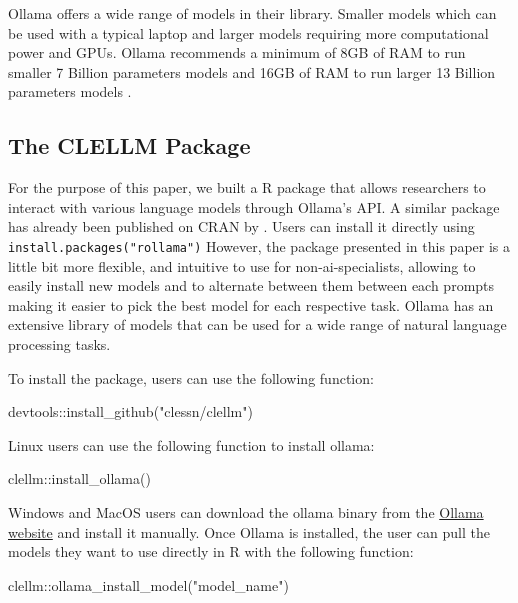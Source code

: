 \documentclass[
  authoryear,
  preprint,
  3p]{elsarticle}
\newenvironment{Shaded}{\begin{snugshade}}{\end{snugshade}}
\newcommand{\FunctionTok}[1]{\textcolor[rgb]{0.28,0.35,0.67}{#1}}
\newcommand{\NormalTok}[1]{\textcolor[rgb]{0.00,0.23,0.31}{#1}}
\newcommand{\SpecialCharTok}[1]{\textcolor[rgb]{0.37,0.37,0.37}{#1}}
\newcommand{\StringTok}[1]{\textcolor[rgb]{0.13,0.47,0.30}{#1}}
\begin{document}
Ollama offers a wide range of models in their library. Smaller models
which can be used with a typical laptop and larger models requiring more
computational power and GPUs. Ollama recommends a minimum of 8GB of RAM
to run smaller 7 Billion parameters models and 16GB of RAM to run larger
13 Billion parameters models \citep{ollama24}.

\subsection{The CLELLM Package}\label{the-clellm-package}

For the purpose of this paper, we built a R package that allows
researchers to interact with various language models through Ollama's
API. A similar package has already been published on CRAN by
\citet{gruber_weber24}. Users can install it directly using
\texttt{install.packages("rollama")} However, the package presented in
this paper is a little bit more flexible, and intuitive to use for
non-ai-specialists, allowing to easily install new models and to
alternate between them between each prompts making it easier to pick the
best model for each respective task. Ollama has an extensive library of
models that can be used for a wide range of natural language processing
tasks.

To install the package, users can use the following function:

\begin{Shaded}
\begin{Highlighting}[]
\NormalTok{devtools}\SpecialCharTok{::}\FunctionTok{install\_github}\NormalTok{(}\StringTok{"clessn/clellm"}\NormalTok{)}
\end{Highlighting}
\end{Shaded}

Linux users can use the following function to install ollama:

\begin{Shaded}
\begin{Highlighting}[]
\NormalTok{clellm}\SpecialCharTok{::}\FunctionTok{install\_ollama}\NormalTok{()}
\end{Highlighting}
\end{Shaded}

Windows and MacOS users can download the ollama binary from the
\href{https://ollama.com/}{Ollama website} and install it manually. Once
Ollama is installed, the user can pull the models they want to use
directly in R with the following function:

\begin{Shaded}
\begin{Highlighting}[]
\NormalTok{clellm}\SpecialCharTok{::}\FunctionTok{ollama\_install\_model}\NormalTok{(}\StringTok{"model\_name"}\NormalTok{)}
\end{Highlighting}
\end{Shaded}
\end{document}
